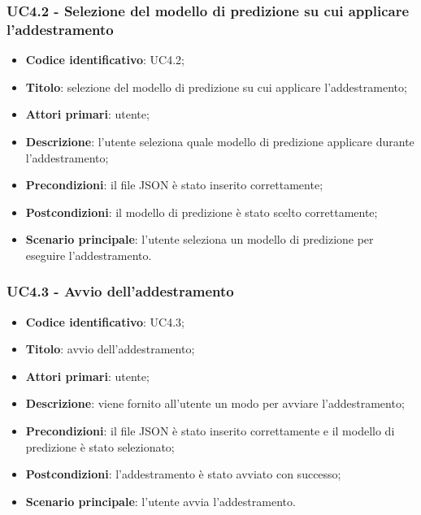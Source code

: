\subsubsection{UC4.2 - Selezione del modello di predizione su cui applicare l'addestramento}
\begin{itemize}
    \item \textbf{Codice identificativo}: UC4.2;
    \item \textbf{Titolo}: selezione del modello di predizione su cui applicare l'addestramento;
    \item \textbf{Attori primari}: utente;
    \item \textbf{Descrizione}: l'utente seleziona quale modello di predizione applicare durante l'addestramento;
    \item \textbf{Precondizioni}: il file JSON è stato inserito correttamente;
    \item \textbf{Postcondizioni}: il modello di predizione è stato scelto correttamente;
    \item \textbf{Scenario principale}: l'utente seleziona un modello di predizione per eseguire l'addestramento.   
\end{itemize}

\subsubsection{UC4.3 - Avvio dell'addestramento}
\begin{itemize}
    \item \textbf{Codice identificativo}: UC4.3;
    \item \textbf{Titolo}: avvio dell'addestramento;
    \item \textbf{Attori primari}: utente;
    \item \textbf{Descrizione}: viene fornito all'utente un modo per avviare l'addestramento;
    \item \textbf{Precondizioni}: il file JSON è stato inserito correttamente e il modello di predizione è stato selezionato;
    \item \textbf{Postcondizioni}: l'addestramento è stato avviato con successo;
    \item \textbf{Scenario principale}: l'utente avvia l'addestramento.
\end{itemize}

